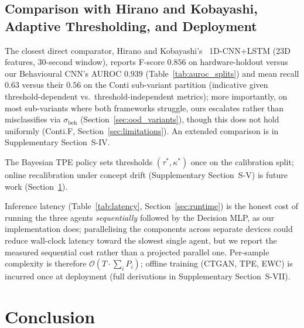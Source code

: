 \documentclass[journal]{IEEEtran}
\begin{document}
\subsection{Comparison with Hirano and Kobayashi, Adaptive Thresholding, and Deployment}\label{sec:discussion_hirano}

The closest direct comparator, Hirano and Kobayashi's~\cite{hirano2025ransmap}
1D-CNN+LSTM (23D features, $30$-second window), reports F-score $0.856$ on
hardware-holdout versus our Behavioural CNN's AUROC $0.939$
(Table~\ref{tab:auroc_splits}) and mean recall $0.63$ versus their $0.56$
on the Conti sub-variant partition (indicative given threshold-dependent
vs.\ threshold-independent metrics); more importantly, on most sub-variants
where both frameworks struggle, ours escalates rather than misclassifies
via $\sigma_{\text{beh}}$ (Section~\ref{sec:ood_variants}), though this
does not hold uniformly (Conti.F, Section~\ref{sec:limitations}). An
extended comparison is in Supplementary Section~S-IV.

The Bayesian TPE policy sets thresholds $(\tau^*, \kappa^*)$ once on the
calibration split; online recalibration under concept drift
(Supplementary Section~S-V) is future work
(Section~\ref{sec:conclusion}).

Inference latency (Table~\ref{tab:latency}, Section~\ref{sec:runtime}) is
the honest cost of running the three agents \emph{sequentially} followed
by the Decision MLP, as our implementation does; parallelising the
components across separate devices could reduce wall-clock latency toward
the slowest single agent, but we report the measured sequential cost
rather than a projected parallel one. Per-sample complexity is therefore
$\mathcal{O}(T \cdot \sum_i P_i)$; offline training (CTGAN, TPE, EWC) is
incurred once at deployment (full derivations in Supplementary
Section~S-VII).

\section{Conclusion}\label{sec:conclusion}
\end{document}
